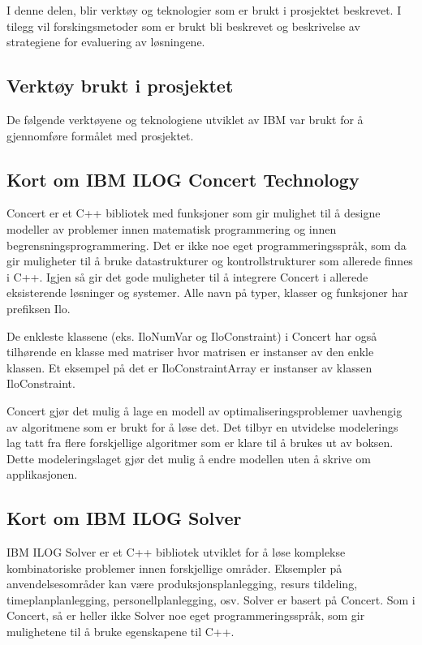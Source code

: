 I denne delen, blir verktøy og teknologier som er brukt i prosjektet beskrevet. I tilegg vil forskingsmetoder som er brukt bli beskrevet og beskrivelse av strategiene for evaluering av løsningene.

\subsection{Verktøy brukt i prosjektet}
De følgende verktøyene og teknologiene utviklet av IBM var brukt for å gjennomføre formålet med prosjektet.

\subsection{Kort om IBM ILOG Concert Technology}
Concert er et C++ bibliotek med funksjoner som gir mulighet til å designe modeller av problemer innen matematisk programmering og innen begrensningsprogrammering. Det er ikke noe eget programmeringsspråk, som da gir muligheter til å bruke datastrukturer og kontrollstrukturer som allerede finnes i C++. Igjen så gir det gode muligheter til å integrere Concert i allerede eksisterende løsninger og systemer. Alle navn på typer, klasser og funksjoner har prefiksen Ilo.

De enkleste klassene (eks. IloNumVar og IloConstraint) i Concert har også tilhørende en klasse med matriser hvor matrisen er instanser av den enkle klassen. Et eksempel på det er IloConstraintArray er instanser av klassen IloConstraint.\cite{cpconcertilog}

Concert gjør det mulig å lage en modell av optimaliseringsproblemer uavhengig av algoritmene som er brukt for å løse det. Det tilbyr en utvidelse  modelerings lag tatt fra flere forskjellige algoritmer som er klare til å brukes ut av boksen. Dette modeleringslaget gjør det mulig å endre modellen uten å skrive om applikasjonen.\cite{cpsolverilog}

\subsection{Kort om IBM ILOG Solver}
IBM ILOG Solver er et C++ bibliotek utviklet for å løse komplekse kombinatoriske problemer innen forskjellige områder. Eksempler på anvendelsesområder kan være produksjonsplanlegging, resurs tildeling, timeplanplanlegging, personellplanlegging, osv. Solver er basert på Concert. Som i Concert, så er heller ikke Solver noe eget programmeringsspråk, som gir mulighetene til å bruke egenskapene til C++.

